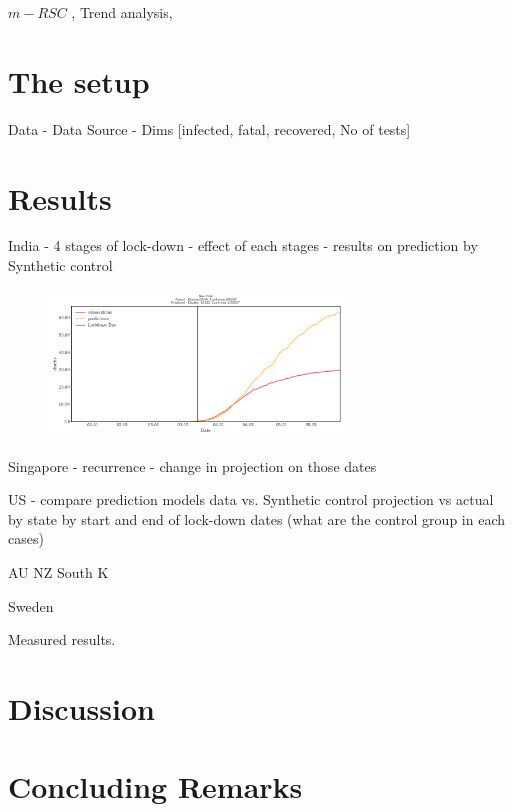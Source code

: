 \documentclass[preprint,authoryear,12pt]{elsarticle}
\begin{document}
	$m-RSC$ \cite{ap08746, JMLR18}, Trend analysis, 
	
	
	
	\section{The setup}
    \label{SEC2}
	Data - Data Source - Dims [infected, fatal, recovered, No of tests] 
	
	
	
	\section{Results}
	\label{SEC3}
	
	India - 4 stages of lock-down - effect of each stages - results on prediction by Synthetic control
\begin{figure}[ht]
	\includegraphics[width=0.7\textwidth]{New York}
\end{figure}

	Singapore - recurrence - change in projection on those dates
	
	US - compare prediction models data vs. Synthetic control projection vs actual by state by start and end of lock-down dates (what are the control group in each cases)
	
	AU NZ South K
	
	Sweden
	
	Measured results. 
	
	\section{Discussion}
	\label{SEC4}
	
	
	\section{Concluding Remarks}
	\label{SEC5}
	
	
		
\end{document}
